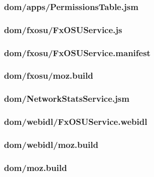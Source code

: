 \documentclass[12pt]{article}
\begin{document}
\subsubsection{dom/apps/PermissionsTable.jsm}

\pagebreak

\subsubsection{dom/fxosu/FxOSUService.js}

\pagebreak

\subsubsection{dom/fxosu/FxOSUService.manifest}

\pagebreak

\subsubsection{dom/fxosu/moz.build}

\pagebreak

\subsubsection{dom/NetworkStatsService.jsm}

\pagebreak

\subsubsection{dom/webidl/FxOSUService.webidl}

\pagebreak

\subsubsection{dom/webidl/moz.build}

\pagebreak

\subsubsection{dom/moz.build}

\pagebreak
\end{document}
